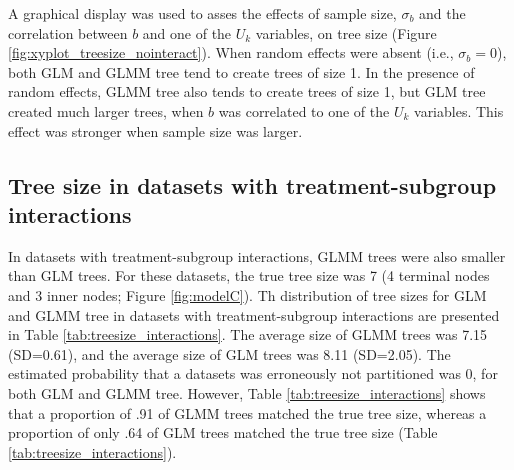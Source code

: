 \documentclass[nobf,doc]{apa}
\begin{document}
A graphical display was used to asses the effects of sample size, $\sigma_b$ and the correlation between $b$ and one of the $U_k$ variables, on tree size (Figure \ref{fig:xyplot_treesize_nointeract}). When random effects were absent (i.e., $\sigma_{b}=0$), both GLM and GLMM tree tend to create trees of size 1. In the presence of random effects, GLMM tree also tends to create trees of size 1, but GLM tree created much larger trees, when $b$ was correlated to one of the $U_k$ variables. This effect was stronger when sample size was larger. 







\subsection{Tree size in datasets with treatment-subgroup interactions}

In datasets with treatment-subgroup interactions, GLMM trees were also smaller than GLM trees. For these datasets, the true tree size was 7 (4 terminal nodes and 3 inner nodes; Figure \ref{fig:modelC}). Th distribution of tree sizes for GLM and GLMM tree in datasets with treatment-subgroup interactions are presented in Table \ref{tab:treesize_interactions}. The average size of GLMM trees was 7.15 (SD=0.61), and the average size of GLM trees was 8.11 (SD=2.05). The estimated probability that a datasets was erroneously not partitioned was 0, for both GLM and GLMM tree. However, Table \ref{tab:treesize_interactions} shows that a proportion of .91 of GLMM trees matched the true tree size, whereas a proportion of only .64 of GLM trees matched the true tree size (Table \ref{tab:treesize_interactions}).
\end{document}
